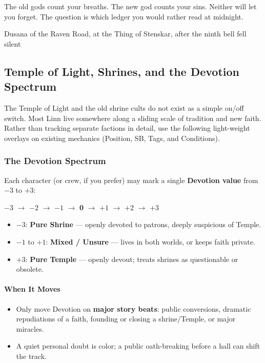\documentclass[11pt]{article}
\begin{document}
\epigraph{The old gods count your breaths. The new god counts your sins. Neither will let you forget. The question is which ledger you would rather read at midnight.}{Dusana of the Raven Road, at the Thing of Stenskar, after the ninth bell fell silent}

\subsection{Temple of Light, Shrines, and the Devotion Spectrum}
\label{sec:temple-devotion}

The Temple of Light and the old shrine cults do not exist as a simple on/off switch. Most Linn
live somewhere along a sliding scale of tradition and new faith. Rather than tracking separate
factions in detail, use the following light-weight overlays on existing mechanics (Position, SB,
Tags, and Conditions).

\subsubsection*{The Devotion Spectrum}

Each character (or crew, if you prefer) may mark a single \textbf{Devotion value} from \(-3\) to
\(+3\):

\begin{center}
\(-3\) \(\rightarrow\) \(-2\) \(\rightarrow\) \(-1\) \(\rightarrow\) \textbf{0} \(\rightarrow\) \(+1\) \(\rightarrow\) \(+2\) \(\rightarrow\) \(+3\)
\end{center}

\begin{itemize}
  \item \(-3\): \textbf{Pure Shrine} --- openly devoted to patrons, deeply suspicious of Temple.
  \item \(-1\) to \(+1\): \textbf{Mixed / Unsure} --- lives in both worlds, or keeps faith private.
  \item \(+3\): \textbf{Pure Temple} --- openly devout; treats shrines as questionable or obsolete.
\end{itemize}

\paragraph*{When It Moves}
\begin{itemize}
  \item Only move Devotion on \textbf{major story beats}: public conversions, dramatic repudiations
        of a faith, founding or closing a shrine/Temple, or major miracles.
  \item A quiet personal doubt is color; a public oath-breaking before a hall can shift the track.
\end{itemize}
\end{document}
